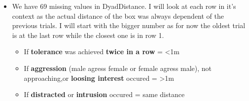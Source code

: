 \documentclass[
]{article}
\providecommand{\tightlist}{%
  \setlength{\itemsep}{0pt}\setlength{\parskip}{0pt}}
\begin{document}
\begin{itemize}
\item
  We have 69 missing values in DyadDistance. I will look at each row in
  it's context as the actual distance of the box was always dependent of
  the previous trials. I will start with the bigger number as for now
  the oldest trial is at the last row while the closest one is in row 1.

  \begin{itemize}
  \tightlist
  \item
    If \textbf{tolerance} was achieved \textbf{twice in a row} =
    \textless1m
  \item
    If \textbf{aggression} (male agress female or female agress male),
    not approaching,or \textbf{loosing interest} occured =
    \textgreater1m
  \item
    If \textbf{distracted} or \textbf{intrusion} occured = same distance
  \end{itemize}


\end{itemize}
\end{document}
